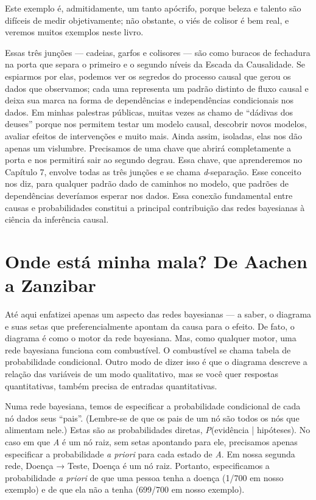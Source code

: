 \documentclass[11pt,a5paper,twoside]{book}
\begin{document}
Este exemplo é, admitidamente, um tanto apócrifo, porque beleza e talento são difíceis de medir objetivamente; não obstante, o viés de colisor é bem real, e veremos muitos exemplos neste livro.

Essas três junções — cadeias, garfos e colisores — são como buracos de fechadura na porta que separa o primeiro e o segundo níveis da Escada da Causalidade. Se espiarmos por elas, podemos ver os segredos do processo causal que gerou os dados que observamos; cada uma representa um padrão distinto de fluxo causal e deixa sua marca na forma de dependências e independências condicionais nos dados. Em minhas palestras públicas, muitas vezes as chamo de “dádivas dos deuses” porque nos permitem testar um modelo causal, descobrir novos modelos, avaliar efeitos de intervenções e muito mais. Ainda assim, isoladas, elas nos dão apenas um vislumbre. Precisamos de uma chave que abrirá completamente a porta e nos permitirá sair ao segundo degrau. Essa chave, que aprenderemos no Capítulo 7, envolve todas as três junções e se chama \textit{d}-separação. Esse conceito nos diz, para qualquer padrão dado de caminhos no modelo, que padrões de dependências deveríamos esperar nos dados. Essa conexão fundamental entre causas e probabilidades constitui a principal contribuição das redes bayesianas à ciência da inferência causal.

\section{Onde está minha mala? De Aachen a Zanzibar}
Até aqui enfatizei apenas um aspecto das redes bayesianas — a saber, o diagrama e suas setas que preferencialmente apontam da causa para o efeito. De fato, o diagrama é como o motor da rede bayesiana. Mas, como qualquer motor, uma rede bayesiana funciona com combustível. O combustível se chama tabela de probabilidade condicional. Outro modo de dizer isso é que o diagrama descreve a relação das variáveis de um modo qualitativo, mas se você quer respostas quantitativas, também precisa de entradas quantitativas.

Numa rede bayesiana, temos de especificar a probabilidade condicional de cada nó dados seus “pais”. (Lembre-se de que os pais de um nó são todos os nós que alimentam nele.) Estas são as probabilidades diretas, \textit{P}(evidência | hipóteses). No caso em que \textit{A} é um nó raiz, sem setas apontando para ele, precisamos apenas especificar a probabilidade \textit{a priori} para cada estado de \textit{A}. Em nossa segunda rede, Doença → Teste, Doença é um nó raiz. Portanto, especificamos a probabilidade \textit{a priori} de que uma pessoa tenha a doença (1/700 em nosso exemplo) e de que ela não a tenha (699/700 em nosso exemplo).
\end{document}
